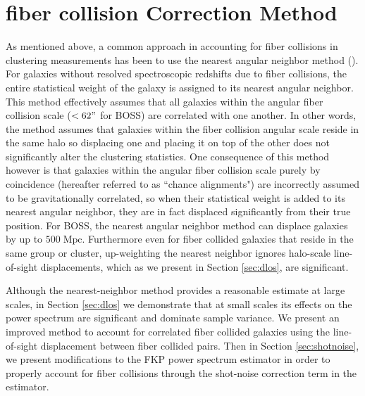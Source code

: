 \documentclass{emulateapj}
\begin{document}
\section{fiber collision Correction Method} \label{sec:fc_corr}
As mentioned above, a common approach in accounting for fiber collisions in clustering measurements has been to use the nearest angular neighbor method (\citealt{Zehavi:2002aa, Berlind:2006aa, Anderson:2012aa}). For galaxies without resolved spectroscopic redshifts due to fiber collisions, the entire statistical weight of the galaxy is assigned to its nearest angular neighbor. This method effectively assumes that all galaxies within the angular fiber collision scale ($< 62 "$ for BOSS) are correlated with one another. In other words, the method assumes that galaxies within the fiber collision angular scale reside in the same halo so displacing one and placing it on top of the other does not significantly alter the clustering statistics. One consequence of this method however is that galaxies within the angular fiber collision scale purely by coincidence (hereafter referred to as ``chance alignments") are incorrectly assumed to be gravitationally correlated, so when their statistical weight is added to its nearest angular neighbor, they are in fact displaced significantly from their true position. For BOSS, the nearest angular neighbor method can displace galaxies by up to $500 \;\mathrm{Mpc}$. Furthermore even for fiber collided galaxies that reside in the same group or cluster, up-weighting the nearest neighbor ignores halo-scale line-of-sight displacements, which as we present in Section \ref{sec:dlos}, are significant. 

Although the nearest-neighbor method provides a reasonable estimate at large scales, in Section \ref{sec:dlos} we demonstrate that at small scales its effects on the power spectrum are significant and dominate sample variance. We present an improved method to account for correlated fiber collided galaxies using the line-of-sight displacement between fiber collided pairs. Then in Section \ref{sec:shotnoise}, we present modifications to the FKP power spectrum estimator in order to properly account for fiber collisions through the shot-noise correction term in the estimator. 

\end{document}
